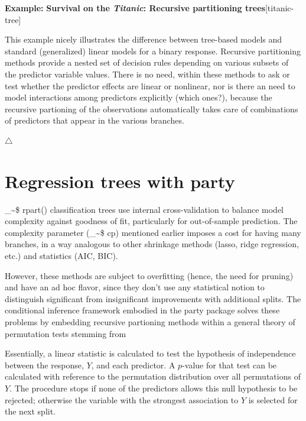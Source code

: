 \documentclass{article}
\makeatletter
\newcommand\code{\bgroup\@makeother\_\@makeother\~\@makeother\$\@codex}
\def\@codex#1{{\normalfont\ttfamily\hyphenchar\font=-1 #1}\egroup}
\newcommand{\func}[1]{\code{#1()}}
\newcommand{\pkg}[1]{\textsf{#1}\nocite{R-#1}}
\newcommand{\Rpackage}[1]{\pkg{#1} package}
\newenvironment{Example}[2][unnamed-example]%
  {\medskip\noindent\textbf{\textsf{Example:}}
   \textbf{#2}\hfill [#1]\par\smallskip
  }
  {\hfill $\triangle$}
\makeatother
\begin{document}
\begin{Example}[titanic-tree]{Survival on the \emph{Titanic}: Recursive partitioning trees}
This example nicely illustrates the difference between tree-based models
and standard (generalized) linear models for a binary response.
Recursive partitioning methods provide a nested set of decision rules 
depending on various subsets of the predictor variable values.
There is no need, within these methods to ask or test whether 
the predictor effects are linear or nonlinear, nor is there an need
to model interactions among predictors explicitly (which ones?),
because the recursive partioning of the observations automatically
takes care of combinations of predictors that appear in the various
branches.


\end{Example}

\section{Regression trees with \pkg{party}}


\func{rpart} classification trees use internal cross-validation
to balance model complexity against goodness of fit, particularly
for out-of-sample prediction. The complexity parameter (\code{cp})
mentioned earlier imposes a cost for having many branches,
in a way analogous to other shrinkage methods (lasso, ridge regression, etc.)
and statistics (AIC, BIC).

However, these methods are subject to overfitting (hence, the need for
pruning) and have an ad hoc flavor, since they don't use any 
statistical notion to distinguish significant from insignificant
improvements with additional splits.
The conditional inference framework embodied in the \Rpackage{party}
solves these problems by embedding recursive partioning methods within
a general theory of permutation tests stemming from
\citet{StrasserWeber:1999}

Essentially, a linear statistic is calculated to test the hypothesis
of independence between the response, $Y$, and each predictor.  A $p$-value
for that test can be calculated with reference to the permutation
distribution over all permutations of $Y$. The procedure stops if
none of the predictors allows this null hypothesis to be rejected;
otherwise the variable with the strongest association to $Y$ is
selected for the next split.
\end{document}
